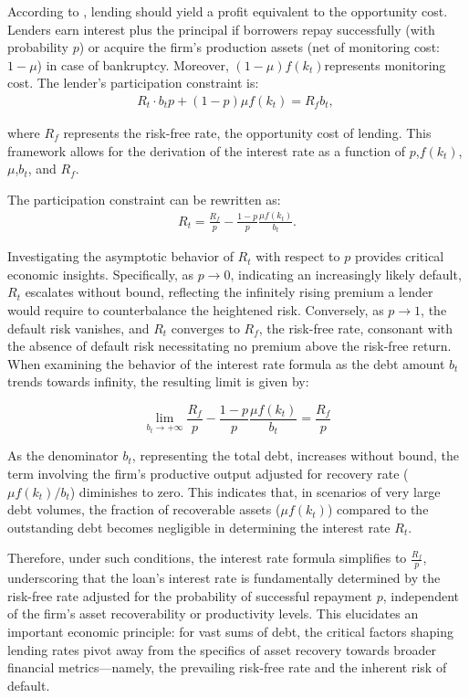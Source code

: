 \documentclass[12pt]{report}
\begin{document}
According to \cite{BerGer86}, lending should yield a profit equivalent to the opportunity cost. Lenders earn
interest plus the principal if borrowers repay successfully (with probability \(p\)) or acquire the firm's production
assets (net of monitoring cost: \(1-\mu\)) in case of bankruptcy. Moreover, \((1-\mu)f(k_t)\)represents monitoring cost.
The lender's participation constraint is:
\begin{align*}
    R_t \cdot b_t p + (1-p) \mu f(k_t) = R_f b_t, \
\end{align*}

where \(R_f\) represents the risk-free rate, the opportunity cost of lending. This framework allows for the derivation
of the interest rate as a function of \(p\),\(f(k_t)\),\(\mu\),\(b_t\), and \(R_f\).

The participation constraint can be rewritten as:
\begin{align}
    R_t=\frac{R_f}{p}  -\frac{ 1-p }{ p }\frac{\mu f(k_t)}{b_t}. \label{eq21}
\end{align}

Investigating the asymptotic behavior of \( R_t \) with respect to \( p \) provides critical economic insights.
Specifically, as \( p \rightarrow 0 \), indicating an increasingly likely default, \( R_t \) escalates without bound,
reflecting the infinitely rising premium a lender would require to counterbalance the heightened risk. Conversely, as \(
p \rightarrow 1 \), the default risk vanishes, and \( R_t \) converges to \( R_f \), the risk-free rate, consonant with
the absence of default risk necessitating no premium above the risk-free return. 
When examining the behavior of the interest rate formula as the debt amount \(b_t\) trends towards infinity, the resulting limit is given by:

\[
\lim_{{b_t \rightarrow +\infty}} \frac{R_f}{p} - \frac{1-p}{p}\frac{\mu f(k_t)}{b_t} = \frac{R_f}{p}
\]

As the denominator \(b_t\), representing the total
debt, increases without bound, the term involving the firm's productive output adjusted for recovery rate (\(\mu
f(k_t)/b_t\)) diminishes to zero. This indicates that, in scenarios of very large debt volumes, the fraction of
recoverable assets (\(\mu f(k_t)\)) compared to the outstanding debt becomes negligible in determining the interest rate
\(R_t\).

Therefore, under such conditions, the interest rate formula simplifies to \(\frac{R_f}{p}\), underscoring that the
loan's interest rate is fundamentally determined by the risk-free rate adjusted for the probability of successful
repayment \(p\), independent of the firm's asset recoverability or productivity levels. This elucidates an important
economic principle: for vast sums of debt, the critical factors shaping lending rates pivot away from the specifics of
asset recovery towards broader financial metrics—namely, the prevailing risk-free rate and the inherent risk of default.
\end{document}
